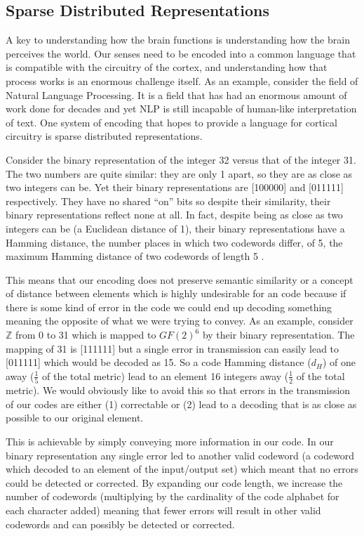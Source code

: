 \documentclass[oneside,12pt,openany]{book}
\begin{document}
	\subsection{Sparse Distributed Representations}\label{sec:sdr}
	
	A key to understanding how the brain functions is understanding how the brain perceives the world. Our senses need to be encoded into a common language that is compatible with the circuitry of the cortex, and understanding how that process works is an enormous challenge itself. As an example, consider the field of Natural Language Processing. It is a field that has had an enormous amount of work done for decades and yet NLP is still incapable of human-like interpretation of text. One system of encoding that hopes to provide a language for cortical circuitry is sparse distributed representations.
	
	Consider the binary representation of the integer 32 versus that of the integer 31. The two numbers are quite similar: they are only 1 apart, so they are as close as two integers can be. Yet their binary representations are [100000] and [011111] respectively. They have no shared ``on'' bits so despite their similarity, their binary representations reflect none at all. In fact, despite being as close as two integers can be (a Euclidean distance of 1), their binary representations have a Hamming distance, the number places in which two codewords differ, of 5, the maximum Hamming distance of two codewords of length 5 \cite{Adams}. 
	
	This means that our encoding does not preserve semantic similarity or a concept of distance between elements which is highly undesirable for an code because if there is some kind of error in the code we could end up decoding something meaning the opposite of what we were trying to convey. As an example, consider $\mathbb{Z}$ from 0 to 31 which is mapped to $GF(2)^{6}$ by their binary representation. The mapping of 31 is [111111] but a single error in transmission can easily lead to [011111] which would be decoded as 15. So a code Hamming distance ($d_{H}$) of one away ($\frac{1}{5}$ of the total metric) lead to an element 16 integers away ($\frac{1}{2}$ of the total metric). We would obviously like to avoid this so that errors in the transmission of our codes are either (1) correctable or (2) lead to a decoding that is as close as possible to our original element.
	
	This is achievable by simply conveying more information in our code. In our binary representation any single error led to another valid codeword (a codeword which decoded to an element of the input/output set) which meant that no errors could be detected or corrected. By expanding our code length, we increase the number of codewords (multiplying by the cardinality of the code alphabet for each character added) meaning that fewer errors will result in other valid codewords and can possibly be detected or corrected. 
	
\end{document}
